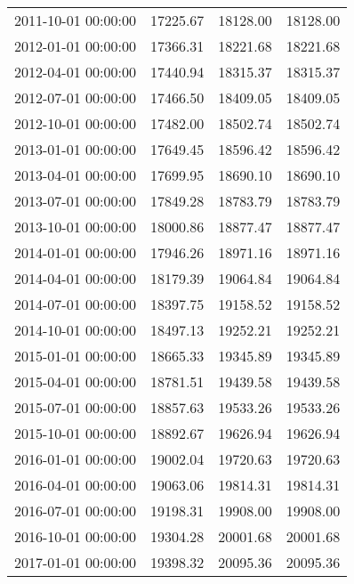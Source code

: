 \begin{table}[H]
\begin{tabular}{|c|c|c|c|}
        2011-10-01 00:00:00 & 17225.67     & 18128.00       & 18128.00        \\
        2012-01-01 00:00:00 & 17366.31     & 18221.68       & 18221.68        \\
        2012-04-01 00:00:00 & 17440.94     & 18315.37       & 18315.37        \\
        2012-07-01 00:00:00 & 17466.50     & 18409.05       & 18409.05        \\
        2012-10-01 00:00:00 & 17482.00     & 18502.74       & 18502.74        \\
        2013-01-01 00:00:00 & 17649.45     & 18596.42       & 18596.42        \\
        2013-04-01 00:00:00 & 17699.95     & 18690.10       & 18690.10        \\
        2013-07-01 00:00:00 & 17849.28     & 18783.79       & 18783.79        \\
        2013-10-01 00:00:00 & 18000.86     & 18877.47       & 18877.47        \\
        2014-01-01 00:00:00 & 17946.26     & 18971.16       & 18971.16        \\
        2014-04-01 00:00:00 & 18179.39     & 19064.84       & 19064.84        \\
        2014-07-01 00:00:00 & 18397.75     & 19158.52       & 19158.52        \\
        2014-10-01 00:00:00 & 18497.13     & 19252.21       & 19252.21        \\
        2015-01-01 00:00:00 & 18665.33     & 19345.89       & 19345.89        \\
        2015-04-01 00:00:00 & 18781.51     & 19439.58       & 19439.58        \\
        2015-07-01 00:00:00 & 18857.63     & 19533.26       & 19533.26        \\
        2015-10-01 00:00:00 & 18892.67     & 19626.94       & 19626.94        \\
        2016-01-01 00:00:00 & 19002.04     & 19720.63       & 19720.63        \\
        2016-04-01 00:00:00 & 19063.06     & 19814.31       & 19814.31        \\
        2016-07-01 00:00:00 & 19198.31     & 19908.00       & 19908.00        \\
        2016-10-01 00:00:00 & 19304.28     & 20001.68       & 20001.68        \\
        2017-01-01 00:00:00 & 19398.32     & 20095.36       & 20095.36        \\

\end{tabular}
\end{table}
